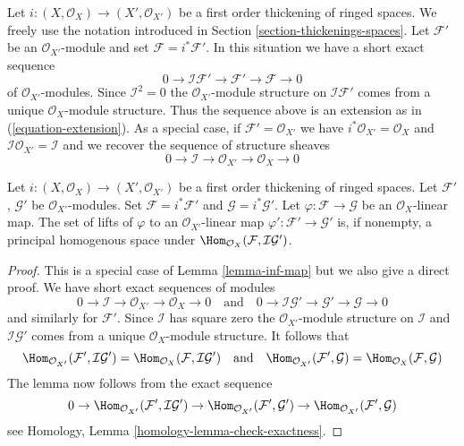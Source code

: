 \noindent
Let $i : (X, \mathcal{O}_X) \to (X', \mathcal{O}_{X'})$ be a first
order thickening of ringed spaces. We freely use the notation introduced in
Section \ref{section-thickenings-spaces}.
Let $\mathcal{F}'$ be an $\mathcal{O}_{X'}$-module
and set $\mathcal{F} = i^*\mathcal{F}'$.
In this situation we have a short exact sequence
$$
0 \to \mathcal{I}\mathcal{F}' \to \mathcal{F}' \to \mathcal{F} \to 0
$$
of $\mathcal{O}_{X'}$-modules. Since $\mathcal{I}^2 = 0$ the
$\mathcal{O}_{X'}$-module structure on $\mathcal{I}\mathcal{F}'$
comes from a unique $\mathcal{O}_X$-module structure.
Thus the sequence above is an extension as in (\ref{equation-extension}).
As a special case, if $\mathcal{F}' = \mathcal{O}_{X'}$ we have
$i^*\mathcal{O}_{X'} = \mathcal{O}_X$ and
$\mathcal{I}\mathcal{O}_{X'} = \mathcal{I}$ and we recover the
sequence of structure sheaves
$$
0 \to \mathcal{I} \to \mathcal{O}_{X'} \to \mathcal{O}_X \to 0
$$

\begin{lemma}
\label{lemma-inf-map-special}
Let $i : (X, \mathcal{O}_X) \to (X', \mathcal{O}_{X'})$
be a first order thickening of ringed spaces.
Let $\mathcal{F}'$, $\mathcal{G}'$ be $\mathcal{O}_{X'}$-modules.
Set $\mathcal{F} = i^*\mathcal{F}'$ and $\mathcal{G} = i^*\mathcal{G}'$.
Let $\varphi : \mathcal{F} \to \mathcal{G}$ be an $\mathcal{O}_X$-linear map.
The set of lifts of $\varphi$ to an $\mathcal{O}_{X'}$-linear map
$\varphi' : \mathcal{F}' \to \mathcal{G}'$ is, if nonempty, a principal
homogenous space under
$\Hom_{\mathcal{O}_X}(\mathcal{F}, \mathcal{I}\mathcal{G}')$.
\end{lemma}

\begin{proof}
This is a special case of Lemma \ref{lemma-inf-map} but we also
give a direct proof. We have short exact sequences of modules
$$
0 \to \mathcal{I} \to \mathcal{O}_{X'} \to \mathcal{O}_X \to 0
\quad\text{and}\quad
0 \to \mathcal{I}\mathcal{G}' \to \mathcal{G}' \to \mathcal{G} \to 0
$$
and similarly for $\mathcal{F}'$.
Since $\mathcal{I}$ has square zero the $\mathcal{O}_{X'}$-module
structure on $\mathcal{I}$ and $\mathcal{I}\mathcal{G}'$ comes from
a unique $\mathcal{O}_X$-module structure. It follows that
$$
\Hom_{\mathcal{O}_{X'}}(\mathcal{F}', \mathcal{I}\mathcal{G}') =
\Hom_{\mathcal{O}_X}(\mathcal{F}, \mathcal{I}\mathcal{G}')
\quad\text{and}\quad
\Hom_{\mathcal{O}_{X'}}(\mathcal{F}', \mathcal{G}) =
\Hom_{\mathcal{O}_X}(\mathcal{F}, \mathcal{G})
$$
The lemma now follows from the exact sequence
$$
0 \to \Hom_{\mathcal{O}_{X'}}(\mathcal{F}', \mathcal{I}\mathcal{G}') \to
\Hom_{\mathcal{O}_{X'}}(\mathcal{F}', \mathcal{G}') \to
\Hom_{\mathcal{O}_{X'}}(\mathcal{F}', \mathcal{G})
$$
see Homology, Lemma \ref{homology-lemma-check-exactness}.
\end{proof}


